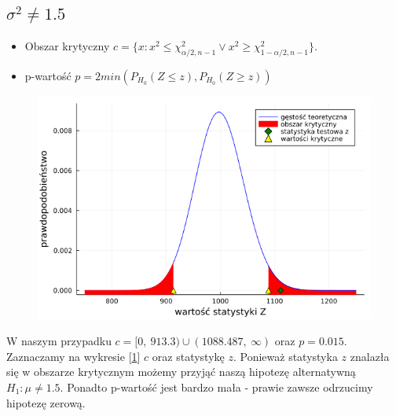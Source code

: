 \documentclass{article}
\theoremstyle{break}
\begin{document}
\subsection*{$\sigma^2 \ne 1.5$}
\begin{itemize}
	\item Obszar krytyczny $c=\{x: x^2\leq \chi^2_{\alpha/2,n-1} \lor x^2\geq \chi^2_{1-\alpha/2,n-1}\}$.
	\item p-wartość $p=2min(P_{H_0}(Z\leq z),P_{H_0}(Z\geq z))$
\end{itemize}
\begin{figure}[H]
	\begin{center}
		\includegraphics[scale=0.5]{Z2.1.png}
		\caption{}
		\label{fig:4}
	\end{center}
\end{figure}
W naszym przypadku $c=[0,~913.3)\cup (1088.487,~\infty)$ oraz $p=0.015$.\\
Zaznaczamy na wykresie [\ref{fig:4}]  $c$ oraz statystykę $z$. Ponieważ statystyka $z$ znalazła się w obszarze krytycznym możemy przyjąć naszą hipotezę alternatywną $H_1: \mu \ne 1.5$. Ponadto p-wartość jest bardzo mała - prawie zawsze odrzucimy hipotezę zerową.
\end{document}
